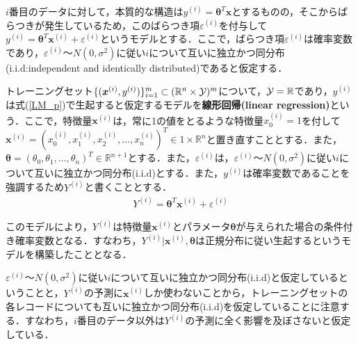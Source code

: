 $i$番目のデータに対して，本質的な構造は$y^{(i)}={\bm \theta}^T{\bm x}$とするものの，そこからばらつきが発生しているため，このばらつき項$\varepsilon^{(i)}$を付与して$y^{(i)}={\bm \theta}^T{\bm x}^{(i)}+\varepsilon^{(i)}$というモデルとする．ここで，ばらつき項$\varepsilon^{(i)}$は確率変数であり，$\varepsilon^{(i)}〜N(0,\sigma^2)$に従い$i$について互いに独立かつ同分布(i.i.d:independent and identically distributed)であると仮定する．

\begin{defi}
トレーニングセット$\{({\bm x}^{(i)},y^{(i)})\}_{i=1}^m \subset (\mathbb{R}^n \times {\cal Y})^m$について，${\cal Y}=\mathbb{R}$であり，$y^{(i)}$は式(\ref{LM_p})で生起すると仮定するモデルを{\bf 線形回帰(linear regression)}という．ここで，特徴量${\bm x}^{(i)}$は，常に1の値をとるような特徴量$x_0^{(i)}=1$を付して${\bm x}^{(i)}=(x_0^{(i)},x_1^{(i)},x_2^{(i)},\ldots,x_n^{(i)})^T \in 1 \times \mathbb{R}^n$と置き直すこととする．また，${\bm \theta}=(\theta_0,\theta_1,\ldots,\theta_n)^T \in \mathbb{R}^{n+1}$とする．また，$\varepsilon^{(i)}$は，$\varepsilon^{(i)}〜N(0,\sigma^2)$に従い$i$について互いに独立かつ同分布(i.i.d)とする．また，$y^{(i)}$は確率変数であることを強調するため$Y^{(i)}$と書くこととする．
\begin{align}
Y^{(i)} = {\bm \theta}^T {\bm x}^{(i)}+\varepsilon^{(i)} \label{LM_p}
\end{align}
\end{defi}

このモデルにより，$Y^{(i)}$は特徴量${\bm x}^{(i)}$とパラメータ${\bm \theta}$が与えられた場合の条件付き確率変数となる．すなわち，$Y^{(i)}|{\bm x}^{(i)},{\bm \theta}$は正規分布に従い生起するというモデルを構築したこととなる．

\begin{rem}
$\varepsilon^{(i)}〜N(0,\sigma^2)$に従い$i$について互いに独立かつ同分布(i.i.d)と仮定しているということと，$Y^{(i)}$の予測に${\bm x}^{(i)}$しか使わないことから，トレーニングセットの各レコードについても互いに独立かつ同分布(i.i.d)を仮定していることに注意する．すなわち，$i$番目のデータ以外は$Y^{(i)}$の予測に全く影響を及ぼさないと仮定している．
\end{rem}

